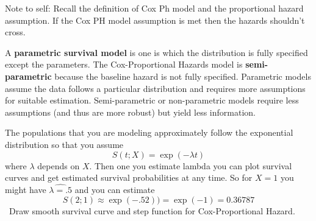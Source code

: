 \documentclass{article}
\begin{document}
%
%
%
%
%

\ir[4.1] Note to self: Recall the definition of Cox Ph model and the proportional hazard assumption. If the Cox PH model assumption is met then the hazards shouldn't cross.

A \textbf{parametric survival model} is one is which the distribution is fully specified except the parameters. The Cox-Proportional Hazards model is \textbf{semi-parametric} because the baseline hazard is not fully specified. Parametric models assume the data follows a particular distribution and requires more assumptions for suitable estimation. Semi-parametric or non-parametric models require less assumptions (and thus are more robust) but yield less information.

 The populations that you are modeling approximately follow the exponential distribution so that you assume
\[
S(t;X) = \exp(-\lambda t)
\]
where $\lambda$ depends on $X$.
Then one you estimate lambda you can plot survival curves and get estimated survival probabilities at any time.
So for $X=1$ you might have $\hat{\lambda=.5}$ and you can estimate
\[ S(2;1) \approx \exp(-.5 2)) = \exp(-1) = 0.36787
\]
\NTS \, Draw smooth survival curve and step function for Cox-Proportional Hazard.
\end{document}

